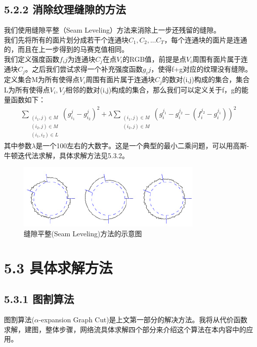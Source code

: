 \documentclass[11pt,a4,notitlepage]{article}
\begin{document}
\begin{CJK}{UTF8}{gkai}
\subsection*{5.2.2 消除纹理缝隙的方法}
我们使用缝隙平整（Seam Leveling）方法来消除上一步还残留的缝隙。\\
我们先将所有的面片划分成若干个连通块$C_{1},C_{2},...C_{T}$，每个连通块的面片是连通的，而且在上一步得到的马赛克值相同。\\
我们定义强度函数$f_{i}{j}$为连通块$C_{j}$在点$V_{i}$的RGB值，前提是点$V_{i}$周围有面片属于连通块$C_{j}$。之后我们尝试求得一个补充强度函数$g_{i}{j}$，使得f+g对应的纹理没有缝隙。\\
定义集合M为所有使得点$V_{i}$周围有面片属于连通块$C_{j}$的数对(i,j)构成的集合，集合L为所有使得点$V_{i},V_{j}$相邻的数对(i,j)构成的集合，那么我们可以定义关于f，g的能量函数如下：
 \begin{align} 
 	\sum_{\substack{(i_{1},j)\in M \\ (i_{2},j)\in M \\ (i_{1},i_{2})\in L}} (g_{i_{1}}^{j}-g_{i_{2}}^{j})^{2}+\lambda \sum_{\substack{(i_{1},j)\in M\\(i_{2},j)\in M}}(g_{i}^{j_{1}}-g_{i}^{j_{2}}-(f_{i}^{j_{2}}-g_{i}^{j_{1}}))^{2}	\end{align}
 其中参数$\lambda$是一个100左右的大数字。这是一个典型的最小二乘问题，可以用高斯-牛顿迭代法求解，具体求解方法见5.3.2。
 \begin{figure}[h]
 	\centering
 	\includegraphics{seam.png}
 	\caption{缝隙平整(Seam Leveling)方法的示意图}
 \end{figure}
 \section*{5.3 具体求解方法}
\subsection*{5.3.1 图割算法}
图割算法($\alpha$-expansion Graph Cut)是上文第一部分的解决方法。\cite{name3}我将从代价函数求解，建图，整体步骤，网络流具体求解四个部分来介绍这个算法在本内容中的应用。

\end{CJK}
\end{document}
